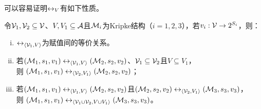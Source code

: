 可以容易证明$\leftrightarrow_V$有如下性质。

\begin{proposition} \label{pro:EqUnion}
	令${\cal V}_1, {\cal V}_2\subseteq {\cal V}$、$V, V_1 \subseteq {\cal A}$且${\cal M}_i$为Kripke结构（$i=1,2,3$），若$v_i: {\cal V}\rightarrow 2^{S_i}$，则：
	\begin{enumerate} [(i)]
		\item $\leftrightarrow_{{\langle{{\cal V}_1,V}\rangle}}$为赋值间的等价关系。
		\item 若$({\cal M}_1, s_1,v_1) \leftrightarrow_{{\langle{{\cal V}_1,V}\rangle}} ({\cal M}_2,s_2,v_2)$、${\cal V}_1 \subseteq {\cal V}_2$且$V \subseteq V_1$，\\
		则 $({\cal M}_1, s_1, v_1) \leftrightarrow_{{\langle{{\cal V}_2,V_1}\rangle}} ({\cal M}_2, s_2, v_2)$；
		\item 若$({\cal M}_1, s_1, v_1) \leftrightarrow_{{\langle{{\cal V}_1,V}\rangle}} ({\cal M}_2,s_2, v_2)$且$({\cal M}_2,s_2, v_2) \leftrightarrow_{{\langle{{\cal V}_2,V_1}\rangle}} ({\cal M}_3,s_3, v_3)$，\\
		则 $({\cal M}_1,s_1,v_1) \leftrightarrow_{{\langle{{\cal V}_1 \cup {\cal V}_2, V \cup V_1}\rangle}} ({\cal M}_3,s_3,v_3)$。
	\end{enumerate}
%	
\end{proposition}
